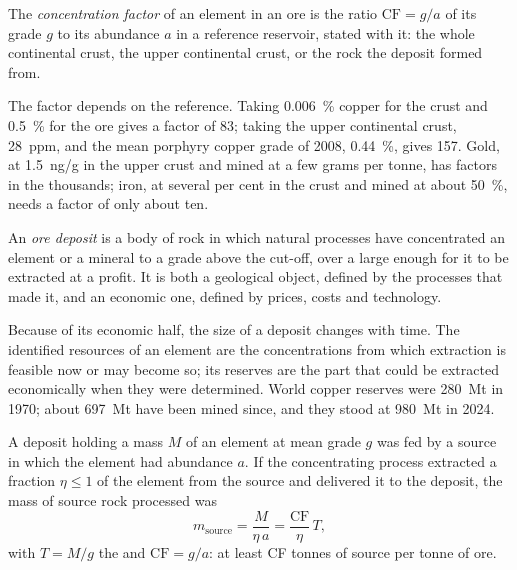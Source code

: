 \begin{definition}\label{def:b2:ore-deposits:cf}
The \emph{concentration factor} of an element in an ore is the ratio
$\mathrm{CF} = g/a$ of its grade $g$ to its abundance $a$ in a reference reservoir, stated with it:
the whole continental crust, the upper continental crust, or the rock the deposit formed from.
\end{definition}

The factor depends on the reference. Taking \qty{0.006}{\percent} copper for the crust and
\qty{0.5}{\percent} for the ore gives a factor of 83; taking the upper continental crust,
\qty{28}{ppm}, and the mean porphyry copper grade of 2008, \qty{0.44}{\percent}, gives 157. Gold,
at \qty{1.5}{ng/g} in the upper crust and mined at a few grams per tonne, has factors in the
thousands; iron, at several per cent in the crust and mined at about \qty{50}{\percent}, needs
a factor of only about ten.

\begin{definition}\label{def:b2:ore-deposits:deposit}
An \emph{ore deposit} is a body of rock in which natural processes have
concentrated an element or a mineral to a grade above the cut-off, over a  large enough
for it to be extracted at a profit. It is both a geological object, defined by the processes that
made it, and an economic one, defined by prices, costs and technology.
\end{definition}

Because of its economic half, the size of a deposit changes with time. The identified resources
of an element are the concentrations from which extraction is feasible now or may become so; its
reserves are the part that could be extracted economically when they were determined. World
copper reserves were \qty{280}{Mt} in 1970; about \qty{697}{Mt} have been mined since, and they
stood at \qty{980}{Mt} in 2024.

\begin{proposition}\label{prop:b2:ore-deposits:mass-balance}
A deposit holding a mass $M$ of an element at mean grade $g$ was fed by a source in which the
element had abundance $a$. If the concentrating process extracted a fraction $\eta \leq 1$ of the
element from the source and delivered it to the deposit, the mass of source rock processed was
\begin{equation}
m_{\mathrm{source}} = \frac{M}{\eta\,a} = \frac{\mathrm{CF}}{\eta}\, T ,
\label{eq:b2:ore-deposits:mass-balance}
\end{equation}
with $T = M/g$ the  and $\mathrm{CF} = g/a$: at least CF tonnes of source per tonne of ore.
\end{proposition}

